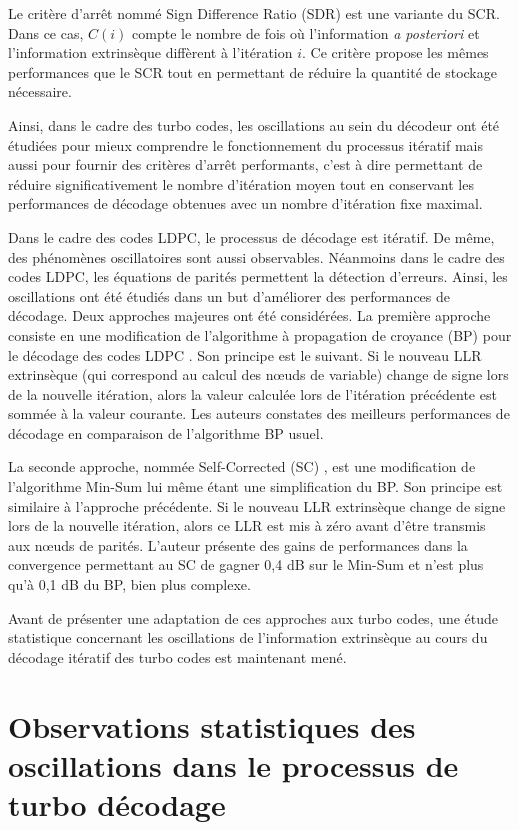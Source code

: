 Le critère d'arrêt nommé Sign Difference Ratio (SDR) \cite{fossorier_scr} est une variante du SCR. Dans ce cas, $C(i)$ 
compte le nombre de fois où l'information \textit{a posteriori} et l'information extrinsèque diffèrent à l'itération $i$. 
Ce critère propose les mêmes performances que le SCR tout en permettant de réduire la quantité de stockage nécessaire.

Ainsi, dans le cadre des turbo codes, les oscillations au sein du décodeur ont été étudiées pour mieux comprendre le 
fonctionnement du processus itératif mais aussi pour fournir des critères d'arrêt performants, c'est à dire permettant de 
réduire significativement le nombre d'itération moyen tout en conservant les performances de décodage obtenues avec un 
nombre d'itération fixe maximal.

Dans le cadre des codes LDPC, le processus de décodage est itératif. De même, des phénomènes oscillatoires sont aussi 
observables. Néanmoins dans le cadre des codes LDPC, les équations de parités permettent la détection d'erreurs. Ainsi, 
les oscillations ont été étudiés dans un but d'améliorer des performances de décodage. Deux approches majeures ont été 
considérées. La première approche consiste en une modification de l'algorithme à propagation de croyance (BP) pour le 
décodage des codes LDPC \cite{gounai_bp_osc}. Son principe est le suivant. Si le nouveau LLR extrinsèque (qui correspond 
au calcul des nœuds de variable) change de signe lors de la nouvelle itération, alors la valeur calculée lors de 
l'itération précédente est sommée à la valeur courante. Les auteurs constates des meilleurs performances de décodage en 
comparaison de l'algorithme BP usuel.

La seconde approche, nommée Self-Corrected (SC) \cite{savin_sc}, est une modification de l'algorithme Min-Sum lui même
étant une simplification du BP. Son principe est similaire à l'approche précédente. Si le nouveau LLR extrinsèque change 
de signe lors de la nouvelle itération, alors ce LLR est mis à zéro avant d'être transmis aux nœuds de parités. L'auteur 
présente des gains de performances dans la convergence permettant au SC de gagner 0,4 dB sur le Min-Sum et n'est plus 
qu'à 0,1 dB du BP, bien plus complexe.

Avant de présenter une adaptation de ces approches aux turbo codes, une étude statistique concernant les oscillations 
de l'information extrinsèque au cours du décodage itératif des turbo codes est maintenant mené.

\section{Observations statistiques des oscillations dans le processus de turbo décodage}

